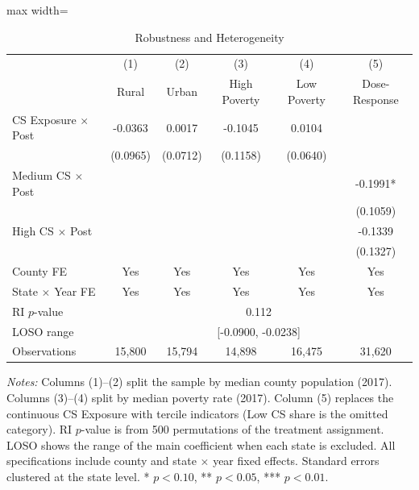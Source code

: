 \begin{table}[htbp]
\centering
\caption{Robustness and Heterogeneity}
\label{tab:robustness}
\begin{adjustbox}{max width=\textwidth}
\begin{tabular}{lccccc}
\toprule
 & (1) & (2) & (3) & (4) & (5) \\
 & Rural & Urban & High Poverty & Low Poverty & Dose-Response \\
\midrule
CS Exposure $\times$ Post & -0.0363 & 0.0017 & -0.1045 & 0.0104 & \\
 & (0.0965) & (0.0712) & (0.1158) & (0.0640) & \\
Medium CS $\times$ Post & & & & & -0.1991* \\
 & & & & & (0.1059) \\
High CS $\times$ Post & & & & & -0.1339 \\
 & & & & & (0.1327) \\
\midrule
County FE & Yes & Yes & Yes & Yes & Yes \\
State $\times$ Year FE & Yes & Yes & Yes & Yes & Yes \\
\midrule
RI $p$-value & \multicolumn{5}{c}{0.112} \\
LOSO range & \multicolumn{5}{c}{[-0.0900, -0.0238]} \\
\midrule
Observations & 15,800 & 15,794 & 14,898 & 16,475 & 31,620 \\
\bottomrule
\end{tabular}
\end{adjustbox}
\begin{tablenotes}[flushleft]
\small
\item \textit{Notes:} Columns (1)--(2) split the sample by median county population (2017). Columns (3)--(4) split by median poverty rate (2017). Column (5) replaces the continuous CS Exposure with tercile indicators (Low CS share is the omitted category). RI $p$-value is from 500 permutations of the treatment assignment. LOSO shows the range of the main coefficient when each state is excluded. All specifications include county and state $\times$ year fixed effects. Standard errors clustered at the state level. * $p<0.10$, ** $p<0.05$, *** $p<0.01$.
\end{tablenotes}
\end{table}

